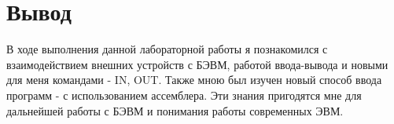 \section{Вывод}
В ходе выполнения данной лабораторной работы я познакомился с взаимодействием внешних устройств с БЭВМ, работой ввода-вывода и новыми для меня командами - IN, OUT. Также мною был изучен новый способ ввода программ - с использованием ассемблера. Эти знания пригодятся мне для дальнейшей работы с БЭВМ и понимания работы современных ЭВМ.
